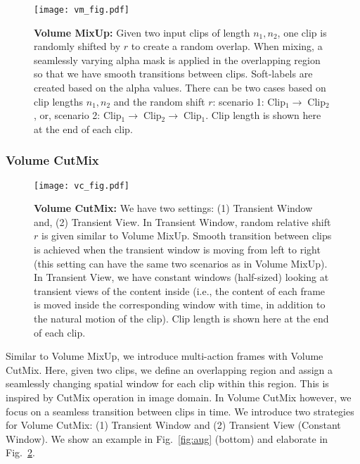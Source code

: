 \documentclass[10pt,twocolumn,letterpaper]{article}
\newcommand{\fref}[1]{Fig.~\ref{#1}}
\begin{document}
\begin{figure}[t]
	\centering
	\vspace{-2mm}
	\texttt{[image: vm\_fig.pdf]}
	\vspace{-2mm}
	\caption{\textbf{Volume MixUp:} Given two input clips of length $n_1, n_2$, one clip is randomly shifted by $r$ to create a random overlap. When mixing, a seamlessly varying alpha mask is applied in the overlapping region so that we have smooth transitions between clips. Soft-labels are created based on the alpha values. There can be two cases based on clip lengths $n_1, n_2$ and the random shift $r$: scenario 1: Clip$_1\rightarrow\;$Clip$_2$, or, scenario 2: Clip$_1\rightarrow\;$Clip$_2\rightarrow\;$Clip$_1$. Clip length is shown here at the end of each clip.}
	\label{fig:vm}
	\vspace{-3mm}
\end{figure}

\vspace{-2mm}
\subsubsection{Volume CutMix}
\label{subsec:cm}

\begin{figure}[t]
	\centering
	\vspace{-2mm}
	\texttt{[image: vc\_fig.pdf]}
	\vspace{-2mm}
	\caption{\textbf{Volume CutMix:} We have two settings: (1) Transient Window and, (2) Transient View. In Transient Window, random relative shift $r$ is given similar to Volume MixUp. Smooth transition between clips is achieved when the transient window is moving from left to right (this setting can have the same two scenarios as in Volume MixUp). In Transient View, we have constant windows (half-sized) looking at transient views of the content inside (i.e., the content of each frame is moved inside the corresponding window with time, in addition to the natural motion of the clip). Clip length is shown here at the end of each clip.}
	\label{fig:vc}
	\vspace{-5mm}
\end{figure}

Similar to Volume MixUp, we introduce multi-action frames with Volume CutMix. Here, given two clips, we define an overlapping region and assign a seamlessly changing spatial window for each clip within this region. This is inspired by CutMix \cite{yun2019cutmix} operation in image domain. In Volume CutMix however, we focus on a seamless transition between clips in time. We introduce two strategies for Volume CutMix: (1) Transient Window and (2) Transient View (Constant Window). We show an example in \fref{fig:aug} (bottom) and elaborate in \fref{fig:vc}. \vspace{-1mm}
\end{document}
